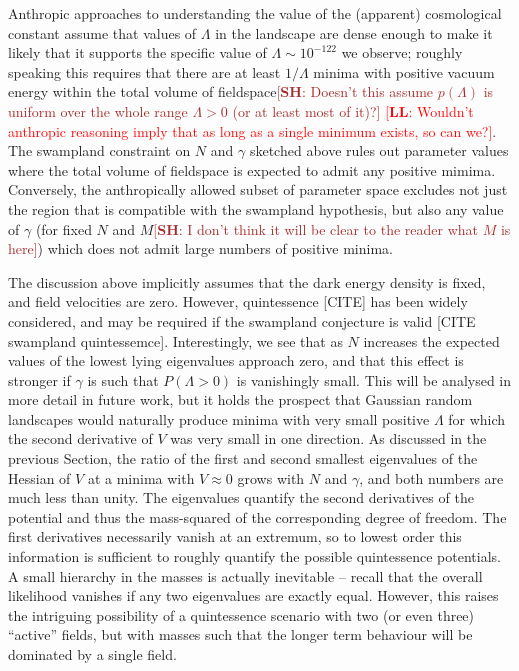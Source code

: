 \documentclass[12pt]{article}
\newcommand{\lfl}[1]{\textcolor{red}{[{\bf LL}: #1]}}
\newcommand{\SH}[1]{\textcolor{brown}{[{\bf SH}: #1]}}
\begin{document}
Anthropic approaches to understanding the value of the (apparent) cosmological constant assume that values of $\Lambda$ in the landscape are  dense enough to make it likely that it supports the specific value of $\Lambda \sim 10^{-122}$ we observe; roughly speaking this requires that there are at least $1/\Lambda$ minima with positive vacuum energy within the total volume of fieldspace\SH{Doesn't this assume $p(\Lambda)$ is uniform over the whole range $\Lambda>0$ (or at least most of it)?} \lfl{Wouldn't anthropic reasoning imply that as long as a single minimum exists, so can we?}. The swampland constraint on $N$ and $\gamma$ sketched above rules out parameter values where the total volume of fieldspace is expected to admit any positive mimima. Conversely, the anthropically allowed subset of parameter space excludes not just the region that is compatible with the swampland hypothesis, but also any value of $\gamma$ (for fixed $N$ and $M$\SH{I don't think it will be clear to the reader what $M$ is here}) which does not admit large numbers of positive minima.

The discussion above implicitly assumes that the dark energy density is fixed, and field velocities are zero. However, quintessence \cite{Tsujikawa2013}[CITE] has been widely considered, and may be required if the swampland conjecture is valid [CITE swampland quintessemce]. Interestingly, we see that as $N$ increases the expected values of the lowest lying eigenvalues approach zero, and that this effect is stronger if $\gamma$ is such that $P(\Lambda>0)$ is vanishingly small. This will be analysed in more detail in future work, but it holds the prospect that Gaussian random landscapes would naturally produce minima with very small positive $\Lambda$  for which the second derivative of $V$ was very small in one direction. As discussed in the previous Section, the ratio of the first and second smallest eigenvalues of the Hessian of $V$ at a minima with $V\approx0$ grows with $N$ and $\gamma$, and both numbers are much less than unity. The eigenvalues quantify the second derivatives of the potential and thus the mass-squared of the corresponding degree of freedom. The first derivatives necessarily vanish at an extremum, so to lowest order this information is sufficient to roughly quantify the possible quintessence potentials.   A small hierarchy in the masses is actually inevitable -- recall that the overall likelihood vanishes if any two eigenvalues are exactly equal. However, this raises the intriguing possibility of a quintessence scenario with two (or even three) ``active'' fields, but with masses such that the longer term behaviour will be dominated by a single field.  
\end{document}
